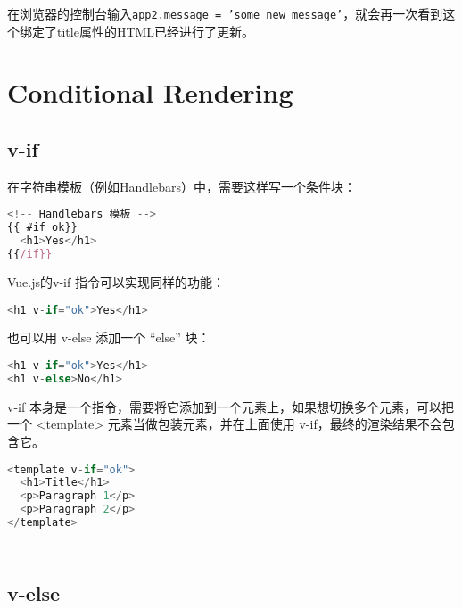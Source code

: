 在浏览器的控制台输入\texttt{app2.message = 'some new message'}，就会再一次看到这个绑定了title属性的HTML已经进行了更新。



\section{Conditional Rendering}

\subsection{v-if}

在字符串模板（例如Handlebars）中，需要这样写一个条件块：


\begin{lstlisting}[language=JavaScript]
<!-- Handlebars 模板 -->
{{ #if ok}}
  <h1>Yes</h1>
{{/if}}
\end{lstlisting}

Vue.js的v-if 指令可以实现同样的功能：

\begin{lstlisting}[language=JavaScript]
<h1 v-if="ok">Yes</h1>
\end{lstlisting}

也可以用 v-else 添加一个 “else” 块：

\begin{lstlisting}[language=JavaScript]
<h1 v-if="ok">Yes</h1>
<h1 v-else>No</h1>
\end{lstlisting}

v-if 本身是一个指令，需要将它添加到一个元素上，如果想切换多个元素，可以把一个 <template> 元素当做包装元素，并在上面使用 v-if，最终的渲染结果不会包含它。


\begin{lstlisting}[language=JavaScript]
<template v-if="ok">
  <h1>Title</h1>
  <p>Paragraph 1</p>
  <p>Paragraph 2</p>
</template>
\end{lstlisting}



\begin{lstlisting}[language=JavaScript]

\end{lstlisting}



\begin{lstlisting}[language=JavaScript]

\end{lstlisting}


\subsection{v-else}

